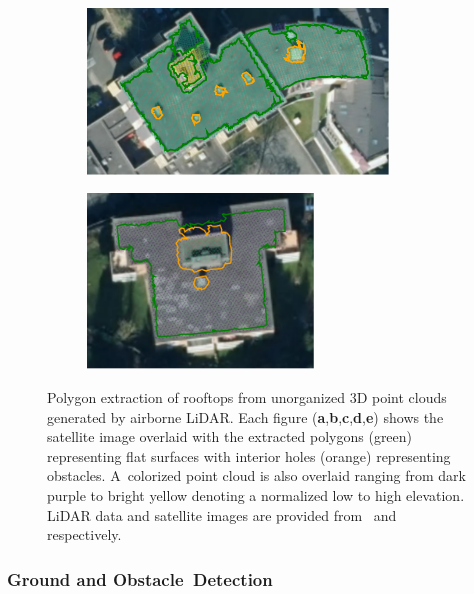 \begin{figure}[ht]
\begin{subfigure}[t]{.55\linewidth}
    \centering\includegraphics[trim=0mm 0mm 0mm 0mm, clip, width=8cm]{chapter_3_polylidar3d/imgs/rooftop/74310126_satellite.pdf}
    \caption{\label{fig:ch3_rooftop_d}}
  \end{subfigure}
  \hfill
  \begin{subfigure}[t]{.40\linewidth}
    \centering\includegraphics[trim=0mm 4mm 0mm 0mm, clip, width=6cm]{chapter_3_polylidar3d/imgs/rooftop/74201616_satellite.pdf}
    \caption{\label{fig:ch3_rooftop_e}}
  \end{subfigure}
  \caption[Example of Polylidar3D used with unorganized point cloud data]{Polygon extraction of rooftops from unorganized 3D point clouds generated by airborne LiDAR. %
  Each figure (\textbf{a},\textbf{b},\textbf{c},\textbf{d},\textbf{e}) shows the satellite image overlaid with the extracted polygons (green) representing flat surfaces with interior holes (orange) representing obstacles. A~colorized point cloud is also overlaid ranging from dark purple to bright yellow denoting a normalized low to high elevation. LiDAR data and satellite images are provided from~\cite{lidar_germany} and~\cite{satellite_germany} respectively. }\label{fig:ch3_rooftop}
\end{figure}
\unskip





\subsubsection{Ground and Obstacle~Detection}\label{sec:ch3_results_kitti}


